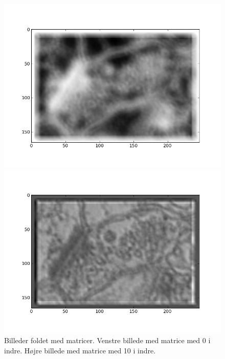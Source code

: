 \begin{figure}[H]
	\begin{minipage}[b]{0.5\linewidth}
		\centering
		\includegraphics[scale=0.4]{files/premethod/img/convolve_edge1.png}
	\end{minipage}
	\hspace{0.5cm}
	\begin{minipage}[b]{0.5\linewidth}
		\centering
		\includegraphics[scale=0.4]{files/premethod/img/convolve_edge2.png}
	\end{minipage}
	\caption{Billeder foldet med matricer. Venstre billede med matrice med 0 i indre. Højre billede med matrice med 10 i indre.\label{fig:premethod_vesEdgeConv}}
\end{figure}

